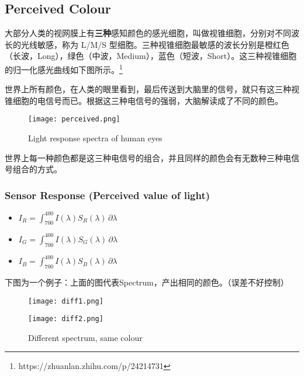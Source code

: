 \documentclass[11pt]{article}
\begin{document}
\subsection{Perceived Colour}
大部分人类的视网膜上有\textbf{三种}感知颜色的感光细胞，叫做视锥细胞，分别对不同波长的光线敏感，称为 L/M/S 型细胞。三种视锥细胞最敏感的波长分别是橙红色（长波，Long），绿色（中波，Medium），蓝色（短波，Short）。这三种视锥细胞的归一化感光曲线如下图所示。\footnote{https://zhuanlan.zhihu.com/p/24214731}

世界上所有颜色，在人类的眼里看到，最后传送到大脑里的信号，就只有这三种视锥细胞的电信号而已。根据这三种电信号的强弱，大脑解读成了不同的颜色。
\begin{figure}[hbt!]
    \centering
    \texttt{[image: perceived.png]}
    \caption{Light response spectra of human eyes}
\end{figure}

\begin{framed}
    \begin{center}
        世界上每一种颜色都是这三种电信号的组合，并且同样的颜色会有无数种三种电信号组合的方式。
    \end{center}
\end{framed}

\subsubsection*{Sensor Response (Perceived value of light)}
\begin{itemize}
    \item $I_R=\int_{700}^{400}I(\lambda)S_R(\lambda)\, \partial \lambda$
    \item $I_G=\int_{700}^{400}I(\lambda)S_G(\lambda)\, \partial \lambda$
    \item $I_B=\int_{700}^{400}I(\lambda)S_B(\lambda)\, \partial \lambda$
\end{itemize}

下图为一个例子：上面的图代表Spectrum，产出相同的颜色。（误差不好控制）
\begin{figure}[hbt!]
    \centering
    \texttt{[image: diff1.png]}
\end{figure}
\begin{figure}[hbt!]
    \centering
    \texttt{[image: diff2.png]}
    \caption{Different spectrum, same colour}
\end{figure}

\newpage
\end{document}
